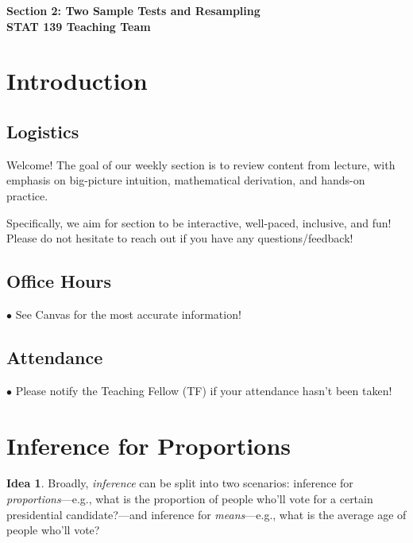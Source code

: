 \documentclass[12pt,oneside]{article}
\theoremstyle{definition}
\newtheorem*{idea}{Idea}
\theoremstyle{remark}
\begin{document}
\pagestyle{fancy}
\begin{center}
\bf \Large
Section 2: Two Sample Tests and Resampling \\[0.5em]
\normalsize
STAT 139 Teaching Team
\end{center}

\section{Introduction}

\subsection{Logistics}

Welcome! The goal of our weekly section is to review content from lecture, with emphasis on big-picture intuition, mathematical derivation, and hands-on practice.

Specifically, we aim for section to be interactive, well-paced, inclusive, and fun! Please do not hesitate to reach out if you have any questions/feedback!

\subsection{Office Hours}

$\bullet$ See Canvas for the most accurate information!

\subsection{Attendance}

$\bullet$ Please notify the Teaching Fellow (TF) if your attendance hasn't been taken!

\section{Inference for Proportions}

\begin{idea}
Broadly, \textit{inference} can be split into two scenarios: inference for \textit{proportions}—e.g., what is the proportion of people who'll vote for a certain presidential candidate?—and inference for \textit{means}—e.g., what is the average age of people who'll vote?
\end{idea}
\end{document}
